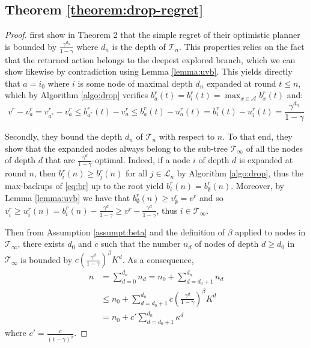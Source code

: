 \documentclass{article}
\begin{document}
\subsection{Theorem \ref{theorem:drop-regret}}
\label{appendix:proof-thm}

\begin{proof}
\citet{Hren2008} first show in Theorem 2 that the simple regret of their optimistic planner is bounded by $\frac{\gamma^{d_n}}{1 - \gamma}$ where $d_n$ is the depth of $\mathcal{T}_n$. This properties relies on the fact that the returned action belongs to the deepest explored branch, which we can show likewise by contradiction using Lemma \ref{lemma:uvb}. This yields directly that $a = i_0$ where $i$ is some node of maximal depth $d_n$ expanded at round $t\leq n$, which by Algorithm \ref{algo:drop} verifies $b_a^r(t) = b_i^r(t) = \max_{x\in\mathcal{A}} b_x^r(t)$ and:
\begin{equation}
\label{eq:Rndn}
v^r - v_a^r = v_{a^*}^r - v_a^r \leq b_{a^*}^r(t) - v_a^r \leq b_{a}^r(t) - u_a^r(t) = b_{i}^r(t) - u_i^r(t) = \frac{\gamma^{d_n}}{1-\gamma}
\end{equation}

Secondly, they bound the depth $d_n$ of $\mathcal{T}_n$ with respect to $n$. To that end, they show that the expanded nodes always belong to the sub-tree $\mathcal{T}_\infty$ of all the nodes of depth $d$ that are $\frac{\gamma^d}{1-\gamma}$-optimal. Indeed, if a node $i$ of depth $d$ is expanded at round $n$, then $b_i^r(n) \geq b_j^r(n)$ for all $j\in \mathcal{L}_n$ by Algorithm \ref{algo:drop}, thus the max-backups of \eqref{eq:br} up to the root yield $b^r_i(n) = b_\emptyset^r(n)$. Moreover, by Lemma \ref{lemma:uvb} we have that $b_\emptyset^r(n) \geq v_\emptyset^r = v^r$ and so $v_i^r \geq u_i^r(n) = b_i^r(n) - \frac{\gamma^d}{1-\gamma} \geq v^r - \frac{\gamma^d}{1-\gamma}$, thus $i \in \mathcal{T}_\infty$.

Then from Assumption \ref{assumpt:beta} and the definition of $\beta$ applied to nodes in $\mathcal{T}_\infty$, there exists $d_0$ and $c$ such that the number $n_d$ of nodes of depth $d \geq d_0$ in $\mathcal{T}_\infty$ is bounded by $c\left(\frac{\gamma^d}{1-\gamma}\right)^\beta K^d$. As a consequence, 
\begin{eqnarray*}
n &= \sum_{d=0}^{d_n} n_d = n_0 + \sum_{d=d_0+1}^{d_n} n_d \\
 &\leq n_0 + \sum_{d=d_0+1}^{d_n} c\left(\frac{\gamma^d}{1-\gamma}\right)^\beta K^d \\
 &= n_0 + c'\sum_{d={d_0+1}}^{d_n} \kappa^d
\end{eqnarray*}
 where $c'=\frac{c}{(1-\gamma)^\beta}$.


\end{proof}
\end{document}
